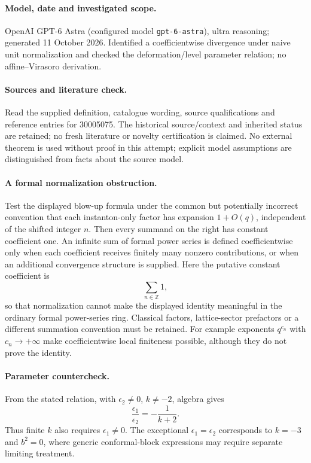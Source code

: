 \documentclass[11pt]{article}
\begin{document}
\paragraph{Model, date and investigated scope.}
OpenAI GPT-6 Astra (configured model \texttt{gpt-6-astra}), ultra reasoning; generated 11 October 2026. Identified a coefficientwise divergence under naive unit normalization and checked the deformation/level parameter relation; no affine–Virasoro derivation.

\paragraph{Sources and literature check.}
Read the supplied definition, catalogue wording, source qualifications and reference entries for 30005075. The historical source/context and inherited status are retained; no fresh literature or novelty certification is claimed. No external theorem is used without proof in this attempt; explicit model assumptions are distinguished from facts about the source model.

\paragraph{A formal normalization obstruction.} Test the displayed blow-up formula under the common but potentially incorrect convention that each instanton-only factor has expansion \(1+O(q)\), independent of the shifted integer \(n\). Then every summand on the right has constant coefficient one. An infinite sum of formal power series is defined coefficientwise only when each coefficient receives finitely many nonzero contributions, or when an additional convergence structure is supplied. Here the putative constant coefficient is
\[
 \sum_{n\in\mathbb Z}1,
\]
so that normalization cannot make the displayed identity meaningful in the ordinary formal power-series ring. Classical factors, lattice-sector prefactors or a different summation convention must be retained. For example exponents \(q^{c_n}\) with \(c_n\to+\infty\) make coefficientwise local finiteness possible, although they do not prove the identity.
\paragraph{Parameter countercheck.} From the stated relation, with \(\epsilon_2\ne0\), \(k\ne-2\), algebra gives
\[
 \frac{\epsilon_1}{\epsilon_2}=-\frac1{k+2}.
\]
Thus finite \(k\) also requires \(\epsilon_1\ne0\). The exceptional \(\epsilon_1=\epsilon_2\) corresponds to \(k=-3\) and \(b^2=0\), where generic conformal-block expressions may require separate limiting treatment.
\end{document}

